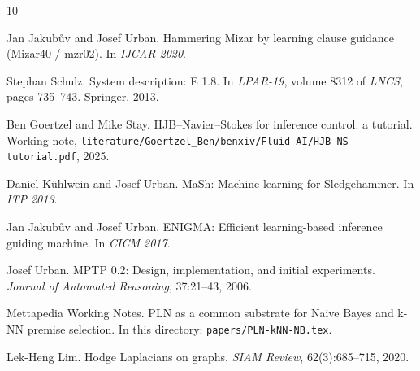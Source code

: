 \documentclass[11pt]{article}
\newcommand{\lpath}[1]{\texttt{\nolinkurl{#1}}}
\begin{document}

\begin{thebibliography}{10}

Jan Jakub\r{u}v and Josef Urban.
\newblock Hammering Mizar by learning clause guidance (Mizar40 / mzr02).
\newblock In \emph{IJCAR 2020}.

Stephan Schulz.
\newblock System description: E 1.8.
\newblock In \emph{LPAR-19}, volume 8312 of \emph{LNCS}, pages 735--743.
        Springer, 2013.

Ben Goertzel and Mike Stay.
\newblock HJB--Navier--Stokes for inference control: a tutorial.
\newblock Working note, \lpath{literature/Goertzel_Ben/benxiv/Fluid-AI/HJB-NS-tutorial.pdf}, 2025.

Daniel K\"uhlwein and Josef Urban.
\newblock MaSh: Machine learning for Sledgehammer.
\newblock In \emph{ITP 2013}.

Jan Jakub\r{u}v and Josef Urban.
\newblock ENIGMA: Efficient learning-based inference guiding machine.
\newblock In \emph{CICM 2017}.

Josef Urban.
\newblock MPTP 0.2: Design, implementation, and initial experiments.
\newblock \emph{Journal of Automated Reasoning}, 37:21--43, 2006.

Mettapedia Working Notes.
\newblock PLN as a common substrate for Naive Bayes and k-NN premise selection.
\newblock In this directory: \lpath{papers/PLN-kNN-NB.tex}.

Lek-Heng Lim.
\newblock Hodge Laplacians on graphs.
\newblock \emph{SIAM Review}, 62(3):685--715, 2020.

\end{thebibliography}
\end{document}
